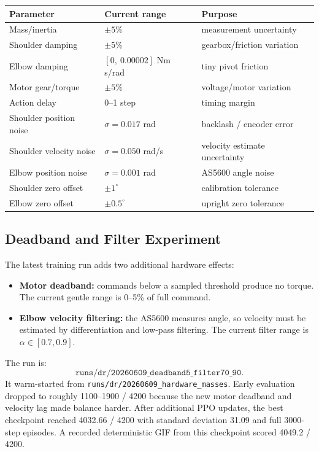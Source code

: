 \documentclass[11pt,a4paper]{article}
\begin{document}
\begin{center}
\begin{tabular}{lll}
\toprule
\textbf{Parameter} & \textbf{Current range} & \textbf{Purpose} \\
\midrule
Mass/inertia & $\pm5\%$ & measurement uncertainty \\
Shoulder damping & $\pm5\%$ & gearbox/friction variation \\
Elbow damping & $[0,\ 0.00002]$ Nm s/rad & tiny pivot friction \\
Motor gear/torque & $\pm5\%$ & voltage/motor variation \\
Action delay & 0--1 step & timing margin \\
Shoulder position noise & $\sigma=0.017$ rad & backlash / encoder error \\
Shoulder velocity noise & $\sigma=0.050$ rad/s & velocity estimate uncertainty \\
Elbow position noise & $\sigma=0.001$ rad & AS5600 angle noise \\
Shoulder zero offset & $\pm1^\circ$ & calibration tolerance \\
Elbow zero offset & $\pm0.5^\circ$ & upright zero tolerance \\
\bottomrule
\end{tabular}
\end{center}

\subsection{Deadband and Filter Experiment}

The latest training run adds two additional hardware effects:
\begin{itemize}
    \item \textbf{Motor deadband:} commands below a sampled threshold produce no
          torque.  The current gentle range is 0--5\% of full command.
    \item \textbf{Elbow velocity filtering:} the AS5600 measures angle, so
          velocity must be estimated by differentiation and low-pass filtering.
          The current filter range is $\alpha\in[0.7,0.9]$.
\end{itemize}

The run is:
\[
\texttt{runs/dr/20260609\_deadband5\_filter70\_90}.
\]
It warm-started from \texttt{runs/dr/20260609\_hardware\_masses}.  Early
evaluation dropped to roughly 1100--1900 / 4200 because the new motor deadband
and velocity lag made balance harder.  After additional PPO updates, the best
checkpoint reached 4032.66 / 4200 with standard deviation 31.09 and full
3000-step episodes.  A recorded deterministic GIF from this checkpoint scored
4049.2 / 4200.
\end{document}
